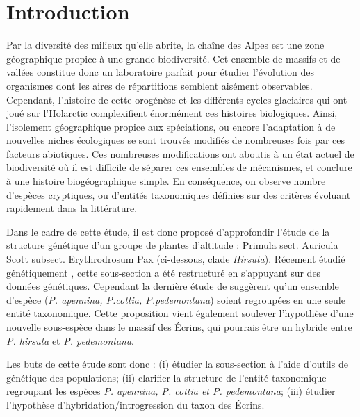 \section{Introduction}

Par la diversité des milieux qu'elle abrite, la chaîne des Alpes est une zone géographique propice à une grande biodiversité.
Cet ensemble de massifs et de vallées constitue donc un laboratoire parfait pour étudier l'évolution des organismes dont les aires de répartitions semblent aisément observables.
Cependant, l'histoire de cette orogénèse et les différents cycles glaciaires qui ont joué sur l'Holarctic complexifient énormément ces histoires biologiques.
Ainsi, l'isolement géographique propice aux spéciations, ou encore l'adaptation à de nouvelles niches écologiques se sont trouvés modifiés de nombreuses fois par ces facteurs abiotiques.
Ces nombreuses modifications ont aboutis à un état actuel de biodiversité où il est difficile de séparer ces ensembles de mécanismes, et conclure à une histoire biogéographique simple.
En conséquence, on observe nombre d'espèces cryptiques, ou d'entités taxonomiques définies sur des critères évoluant rapidement dans la littérature.

Dans le cadre de cette étude, il est donc proposé d'approfondir l'étude de la structure génétique d'un groupe de plantes d'altitude : Primula sect. Auricula Scott subsect. Erythrodrosum Pax (ci-dessous, clade \textit{Hirsuta}).
Récement étudié génétiquement \citep{Zhang2004,Zhang2004a, Boucher2016a}, cette sous-section a été restructuré en s'appuyant sur des données génétiques.
Cependant la dernière étude de \citet{Boucher2016a} suggèrent qu'un ensemble d'espèce (\textit{P. apennina, P.cottia, P.pedemontana}) soient regroupées en une seule entité taxonomique.
Cette proposition vient également soulever l'hypothèse d'une nouvelle sous-espèce dans le massif des Écrins, qui pourrais être un hybride entre \textit{P. hirsuta} et \textit{P. pedemontana}.

Les buts de cette étude sont donc : (i) étudier la sous-section à l'aide d'outils de génétique des populations; (ii) clarifier la structure de l'entité taxonomique regroupant les espèces \textit{P. apennina, P. cottia et P. pedemontana}; (iii) étudier l'hypothèse d'hybridation/introgression du taxon des Écrins.


